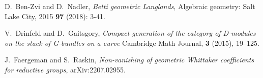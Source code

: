 \documentclass[9pt]{amsart}
\theoremstyle{remark}
\theoremstyle{definition}
\theoremstyle{remark}
\numberwithin{equation}{section}
\begin{document}
\begin{thebibliography}{99}
 D.~Ben-Zvi and D.~Nadler, \emph{Betti geometric Langlands}, 
Algebraic geometry: Salt Lake City, 2015 {\bf 97} (2018): 3-41.







 V.~Drinfeld and D.~Gaitsgory, {\it Compact generation of the category of D-modules on the stack of G-bundles on a curve}
Cambridge Math Journal, {\bf 3} (2015), 19--125. 

 J.~Faergeman and S.~Raskin, {\it Non-vanishing of geometric Whittaker coefficients for reductive groups}, \newline
arXiv:2207.02955.





\end{thebibliography}
\end{document}
